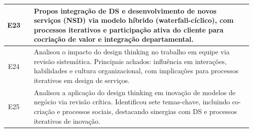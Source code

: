 \begin{longtable}{|c|m{4cm}|m{10cm}|}
	E23 & \cite{Vieira2025} & Propos integração de DS e desenvolvimento de novos serviços (NSD) via modelo híbrido (waterfall-cíclico), com processos iterativos e participação ativa do cliente para cocriação de valor e integração departamental. \\ \hline
	E24 & \cite{schlott2024design} & Analisou o impacto do design thinking no trabalho em equipe via revisão sistemática. Principais achados: influência em interações, habilidades e cultura organizacional, com implicações para processos iterativos em design de serviços. \\ \hline
	E25 & \cite{you2022applying} & Analisou a aplicação do design thinking em inovação de modelos de negócio via revisão crítica. Identificou sete temas-chave, incluindo co-criação e processos sociais, destacando sinergias com DS e processos iterativos de inovação. \\ \hline
	
\end{longtable}










 
